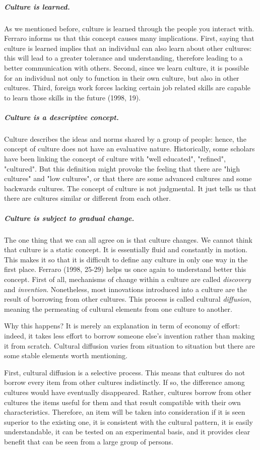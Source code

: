 \documentclass[../main.tex]{subfiles}
\begin{document}
\subparagraph*{Culture is learned.} As we mentioned before, culture is learned through the people you interact with. Ferraro informs us that this concept causes many implications. First, saying that culture is learned implies that an individual can also learn about other cultures: this will lead to a greater tolerance and understanding, therefore leading to a better communication with others. Second, since we learn culture, it is possible for an individual not only to function in their own culture, but also in other cultures. Third, foreign work forces lacking certain job related skills are capable to learn those skills in the future (1998, 19).

\subparagraph*{Culture is a descriptive concept.} Culture describes the ideas and norms shared by a group of people: hence, the concept of culture does not have an evaluative nature. Historically, some scholars have been linking the concept of culture with "well educated", "refined", "cultured". But this definition might provoke the feeling that there are "high cultures" and "low cultures", or that there are some advanced cultures and some backwards cultures. The concept of culture is not judgmental. It just tells us that there are cultures similar or different from each other.

\subparagraph*{Culture is subject to gradual change.} The one thing that we can all agree on is that culture changes. We cannot think that culture is a static concept.
It is essentially fluid and constantly in motion. This makes it so that it is difficult to define any culture in only one way in the first place. Ferraro (1998, 25-29) helps us once again to understand better this concept. First of all, mechanisms of change within a culture are called \textit{discovery} and \textit{invention}. Nonetheless, most innovations introduced into a culture are the result of borrowing from other cultures. This process is called cultural \textit{diffusion}, meaning the permeating of cultural elements from one culture to another.

Why this happens? It is merely an explanation in term of economy of effort: indeed, it takes less effort to borrow someone else's invention rather than making it from scratch. Cultural diffusion varies from situation to situation but there are some stable elements worth mentioning.

First, cultural diffusion is a selective process. This means that cultures do not borrow every item from other cultures indistinctly. If so, the difference among cultures would have eventually disappeared. Rather, cultures borrow from other cultures the items useful for them and that result compatible with their own characteristics. Therefore, an item will be taken into consideration if it is seen superior to the existing one, it is consistent with the cultural pattern, it is easily understandable, it can be tested on an experimental basis, and it provides clear benefit that can be seen from a large group of persons.
\end{document}
